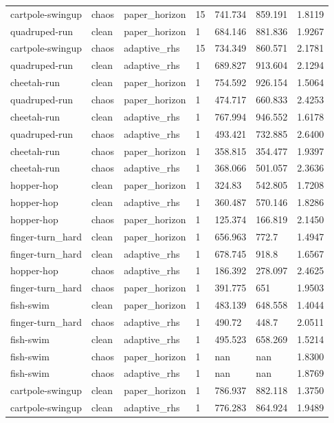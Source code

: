 \begin{tabular}{lllllll}
cartpole-swingup & chaos & paper\_horizon & 15 & 741.734 & 859.191 & 1.8119 \\
quadruped-run & clean & paper\_horizon & 1 & 684.146 & 881.836 & 1.9267 \\
cartpole-swingup & chaos & adaptive\_rhs & 15 & 734.349 & 860.571 & 2.1781 \\
quadruped-run & clean & adaptive\_rhs & 1 & 689.827 & 913.604 & 2.1294 \\
cheetah-run & clean & paper\_horizon & 1 & 754.592 & 926.154 & 1.5064 \\
quadruped-run & chaos & paper\_horizon & 1 & 474.717 & 660.833 & 2.4253 \\
cheetah-run & clean & adaptive\_rhs & 1 & 767.994 & 946.552 & 1.6178 \\
quadruped-run & chaos & adaptive\_rhs & 1 & 493.421 & 732.885 & 2.6400 \\
cheetah-run & chaos & paper\_horizon & 1 & 358.815 & 354.477 & 1.9397 \\
cheetah-run & chaos & adaptive\_rhs & 1 & 368.066 & 501.057 & 2.3636 \\
hopper-hop & clean & paper\_horizon & 1 & 324.83 & 542.805 & 1.7208 \\
hopper-hop & clean & adaptive\_rhs & 1 & 360.487 & 570.146 & 1.8286 \\
hopper-hop & chaos & paper\_horizon & 1 & 125.374 & 166.819 & 2.1450 \\
finger-turn\_hard & clean & paper\_horizon & 1 & 656.963 & 772.7 & 1.4947 \\
finger-turn\_hard & clean & adaptive\_rhs & 1 & 678.745 & 918.8 & 1.6567 \\
hopper-hop & chaos & adaptive\_rhs & 1 & 186.392 & 278.097 & 2.4625 \\
finger-turn\_hard & chaos & paper\_horizon & 1 & 391.775 & 651 & 1.9503 \\
fish-swim & clean & paper\_horizon & 1 & 483.139 & 648.558 & 1.4044 \\
finger-turn\_hard & chaos & adaptive\_rhs & 1 & 490.72 & 448.7 & 2.0511 \\
fish-swim & clean & adaptive\_rhs & 1 & 495.523 & 658.269 & 1.5214 \\
fish-swim & chaos & paper\_horizon & 1 & nan & nan & 1.8300 \\
fish-swim & chaos & adaptive\_rhs & 1 & nan & nan & 1.8769 \\
cartpole-swingup & clean & paper\_horizon & 1 & 786.937 & 882.118 & 1.3750 \\
cartpole-swingup & clean & adaptive\_rhs & 1 & 776.283 & 864.924 & 1.9489 \\

\end{tabular}
